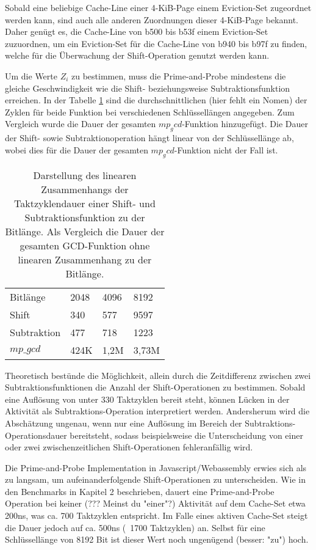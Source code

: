 Sobald eine beliebige Cache-Line einer 4-KiB-Page einem Eviction-Set zugeordnet werden kann, sind auch alle anderen Zuordnungen dieser 4-KiB-Page bekannt.
Daher genügt es, die Cache-Line von b500 bis b53f einem Eviction-Set zuzuordnen, um ein Eviction-Set für die Cache-Line von b940 bis b97f zu finden, welche für die Überwachung der Shift-Operation genutzt werden kann.

Um die Werte $Z_i$ zu bestimmen, muss die Prime-and-Probe mindestens die gleiche Geschwindigkeit wie die Shift- beziehungsweise Subtraktionsfunktion erreichen.
In der Tabelle \ref{tbl:ShiftSubCycles} sind die durchschnittlichen (hier fehlt ein Nomen) der Zyklen für beide Funktion bei verschiedenen Schlüssellängen angegeben. Zum Vergleich wurde die Dauer der gesamten $mp_gcd$-Funktion hinzugefügt.
Die Dauer der Shift- sowie Subtraktionoperation hängt linear von der Schlüssellänge ab, wobei dies für die Dauer der gesamten $mp_gcd$-Funktion nicht der Fall ist.

\begin{table}[h]
\caption{Darstellung des linearen Zusammenhangs der Taktzyklendauer einer Shift- und Subtraktionsfunktion zu der Bitlänge. Als Vergleich die Dauer der gesamten GCD-Funktion ohne linearen Zusammenhang zu der Bitlänge.}
\label{tbl:ShiftSubCycles}
\begin{tabular}{llll}
Bitlänge    & 2048 & 4096 & 8192 \\
Shift       & 340  & 577  & 9597 \\
Subtraktion & 477  & 718  & 1223 \\
$mp\_gcd$    & 424K & 1,2M & 3,73M
\end{tabular}
\end{table}

Theoretisch bestünde die Möglichkeit, allein durch die Zeitdifferenz zwischen zwei Subtraktionsfunktionen die Anzahl der Shift-Operationen zu bestimmen.
Sobald eine Auflösung von unter 330 Taktzyklen bereit steht, können Lücken in der Aktivität als Subtraktions-Operation interpretiert werden.
Andersherum wird die Abschätzung ungenau, wenn nur eine Auflösung im Bereich der Subtraktions-Operationsdauer bereitsteht, sodass beispielsweise die Unterscheidung von einer oder zwei zwischenzeitlichen Shift-Operationen fehleranfällig wird.

Die Prime-and-Probe Implementation in Javascript/Webassembly erwies sich als zu langsam, um aufeinanderfolgende Shift-Operationen zu unterscheiden.
Wie in den Benchmarks in Kapitel 2 beschrieben, dauert eine Prime-and-Probe Operation bei keiner (??? Meinst du "einer"?) Aktivität auf dem Cache-Set etwa 200ns, was ca. 700 Taktzyklen entspricht.
Im Falle eines aktiven Cache-Set steigt die Dauer jedoch auf ca. 500ns (~1700 Taktzyklen) an.
Selbst für eine Schlüssellänge von 8192 Bit ist dieser Wert noch ungenügend (besser: "zu") hoch.

